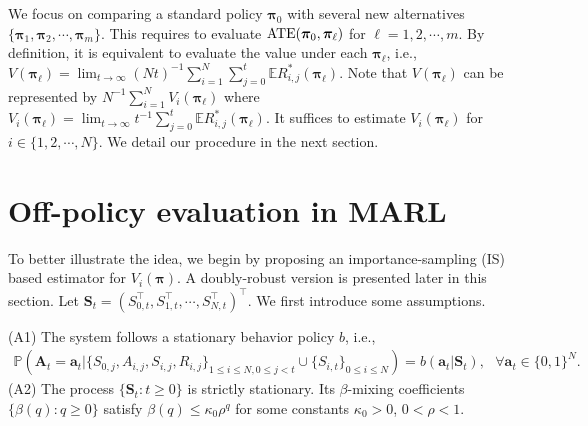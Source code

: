 \documentclass{article}
\newcommand{\Mean}{{\mathbb{E}}}
\newcommand{\prob}{{\mathbb{P}}}
\begin{document}
We focus on comparing a standard policy $\bm{\pi}_0$ with several new alternatives $\{\bm{\pi}_1,\bm{\pi}_2,\cdots,\bm{\pi}_m\}$. This requires to evaluate $\hbox{ATE}(\bm{\pi}_0,\bm{\pi}_\ell)$ for $\ell=1,2,\cdots,m$. By definition, it is equivalent to evaluate the value under each $\bm{\pi}_{\ell}$, i.e.,  $V(\bm{\pi}_{\ell})=\lim_{t\to \infty} (Nt)^{-1}\sum_{i=1}^N \sum_{j=0}^t \Mean R_{i,j}^*(\bm{\pi}_{\ell})$. Note that $V(\bm{\pi}_{\ell})$ can be represented by $N^{-1} \sum_{i=1}^N V_i(\bm{\pi}_{\ell})$ where $V_i(\bm{\pi}_{\ell})=\lim_{t\to \infty} t^{-1}\sum_{j=0}^t \Mean R_{i,j}^*(\bm{\pi}_{\ell})$. It suffices to estimate $V_i(\bm{\pi}_{\ell})$ for $i\in \{1,2,\cdots,N\}$. We detail our procedure in the next section. 


\vspace{-0.2cm}
\section{Off-policy evaluation in MARL}\label{sec:method}
To better illustrate the idea, we begin by proposing an importance-sampling (IS) based estimator for $V_i(\bm{\pi})$. A doubly-robust version is presented later in this section. Let $\bm{S}_t=(S_{0,t}^\top,S_{1,t}^\top,\cdots,S_{N,t}^\top)^\top$. 
We first introduce some assumptions. %

(A1) The system follows a stationary behavior policy $b$, i.e., %
\vspace{-0.1cm}
\begin{eqnarray*}
	\prob(\bm{A}_t=\bm{a}_t|\{S_{0,j},A_{i,j},S_{i,j},R_{i,j} \}_{1\le i\le N, 0\le j<t}\cup \{S_{i,t}\}_{0\le i\le N} )=b(\bm{a}_t|\bm{S}_t),\,\,\,\,\forall \bm{a}_t\in \{0,1\}^N.
\end{eqnarray*}
(A2) The process $\{\bm{S}_t:t\ge 0\}$ is strictly stationary. Its $\beta$-mixing coefficients $\{\beta(q):q\ge 0\}$ \citep[see e.g.,][for a detailed definition]{Bradley2005} satisfy $\beta(q)\le \kappa_0 \rho^{q}$ for some constants $\kappa_0>0$, $0<\rho<1$. 
\end{document}
